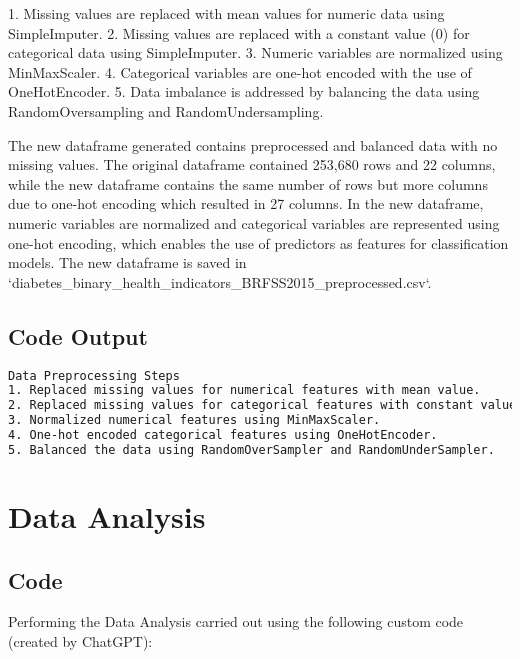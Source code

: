 \documentclass[12pt]{article}
\begin{document}
1. Missing values are replaced with mean values for numeric data using SimpleImputer.
2. Missing values are replaced with a constant value (0) for categorical data using SimpleImputer.
3. Numeric variables are normalized using MinMaxScaler.
4. Categorical variables are one-hot encoded with the use of OneHotEncoder.
5. Data imbalance is addressed by balancing the data using RandomOversampling and RandomUndersampling.

The new dataframe generated contains preprocessed and balanced data with no missing values. The original dataframe contained 253,680 rows and 22 columns, while the new dataframe contains the same number of rows but more columns due to one-hot encoding which resulted in 27 columns. In the new dataframe, numeric variables are normalized and categorical variables are represented using one-hot encoding, which enables the use of predictors as features for classification models. The new dataframe is saved in `diabetes\_binary\_health\_indicators\_BRFSS2015\_preprocessed.csv`.

\subsection{Code Output}

\begin{lstlisting}[language=TeX]
Data Preprocessing Steps
1. Replaced missing values for numerical features with mean value.
2. Replaced missing values for categorical features with constant value of 0.
3. Normalized numerical features using MinMaxScaler.
4. One-hot encoded categorical features using OneHotEncoder.
5. Balanced the data using RandomOverSampler and RandomUnderSampler.

\end{lstlisting}

\section{Data Analysis} \subsection{Code}Performing the Data Analysis carried out using the following custom code (created by ChatGPT):
\end{document}
